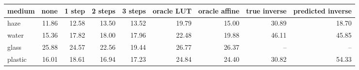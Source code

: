 \begin{tabular}{lrrrrrrrr}
\toprule
medium & none & 1 step & 2 steps & 3 steps & oracle LUT & oracle affine & true inverse & predicted inverse \\
\midrule
haze & 11.86 & 12.58 & 13.50 & 13.52 & 19.79 & 15.00 & 30.89 & 18.70 \\
water & 15.36 & 17.82 & 18.00 & 17.96 & 22.48 & 19.88 & 46.11 & 45.85 \\
glass & 25.88 & 24.57 & 22.56 & 19.44 & 26.77 & 26.37 & -- & -- \\
plastic & 16.01 & 18.61 & 16.94 & 17.23 & 24.84 & 24.40 & 30.82 & 54.33 \\
\bottomrule
\end{tabular}
